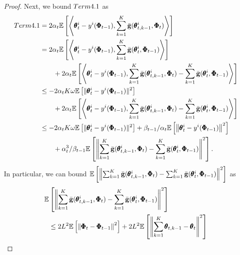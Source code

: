 \documentclass{article} %
\theoremstyle{plain}
\theoremstyle{definition}
\theoremstyle{remark}
\begin{document}
{\begin{proof}
Next, we bound $\textnormal{Term {4.1}}$ as
\begin{align}\label{eq:38}
    \textnormal{Term {4.1}}&=2\alpha_t\mathbb{E}\left[\left\langle\pmb{\theta}_{t}^i-y^i(\pmb{\Phi}_{t-1}), \sum_{k=1}^K\bar{\bg}(\pmb{\theta}_{t,k-1}^i,\pmb{\Phi}_t)\right\rangle\right]\nonumber\allowdisplaybreaks\\
    &=2\alpha_t\mathbb{E}\left[\left\langle\pmb{\theta}_{t}^i-y^i(\pmb{\Phi}_{t-1}), \sum_{k=1}^K\bar{\bg}(\pmb{\theta}_{t}^i,\pmb{\Phi}_{t-1})\right\rangle\right]\nonumber\allowdisplaybreaks\\
    &\qquad+2\alpha_t\mathbb{E}\left[\left\langle\pmb{\theta}_{t}^i-y^i(\pmb{\Phi}_{t-1}), \sum_{k=1}^K\bar{\bg}(\pmb{\theta}_{t,k-1}^i,\pmb{\Phi}_t)-\sum_{k=1}^K\bar{\bg}(\pmb{\theta}_{t}^i,\pmb{\Phi}_{t-1})\right\rangle\right]\nonumber\allowdisplaybreaks\\
    &\leq -2\alpha_tK\omega\mathbb{E}\left[\|\pmb{\theta}_t^i-y^i(\pmb{\Phi}_{t-1})\|^2\right]\nonumber\allowdisplaybreaks\\
    &\qquad+2\alpha_t\mathbb{E}\left[\left\langle\pmb{\theta}_{t}^i-y^i(\pmb{\Phi}_{t-1}), \sum_{k=1}^K\bar{\bg}(\pmb{\theta}_{t,k-1}^i,\pmb{\Phi}_t)-\sum_{k=1}^K\bar{\bg}(\pmb{\theta}_{t}^i,\pmb{\Phi}_{t-1})\right\rangle\right]\nonumber\allowdisplaybreaks\\
    &\leq -2\alpha_tK\omega\mathbb{E}\left[\|\pmb{\theta}_t^i-y^i(\pmb{\Phi}_{t-1})\|^2\right]+\beta_{t-1}/\alpha_t\mathbb{E}\left[\left\|\pmb{\theta}_{t}^i-y^i(\pmb{\Phi}_{t-1})\right\|^2 \right]\nonumber\allowdisplaybreaks\\
    &\qquad+\alpha_t^3/\beta_{t-1}\mathbb{E}\left[\left\|\sum_{k=1}^K\bar{\bg}(\pmb{\theta}_{t,k-1}^i,\pmb{\Phi}_t)-\sum_{k=1}^K\bar{\bg}(\pmb{\theta}_{t}^i,\pmb{\Phi}_{t-1})\right\|^2\right].
\end{align}
In particular, we can bound  $\mathbb{E}\left[\left\|\sum_{k=1}^K\bar{{\mathbf{g}}}(\pmb{\theta}_{t,k-1}^i,\pmb{\Phi}_t)-\sum_{k=1}^K\bar{{\mathbf{g}}}(\pmb{\theta}_{t}^i,\pmb{\Phi}_{t-1}) \right\|^2\right]$ as 
\begin{align}\label{eq:39}
\mathbb{E}&\left[\left\|\sum_{k=1}^K\bar{\bg}(\pmb{\theta}_{t,k-1}^i,\pmb{\Phi}_t)-\sum_{k=1}^K\bar{\bg}(\pmb{\theta}_{t}^i,\pmb{\Phi}_{t-1}) \right\|^2\right]\nonumber\allowdisplaybreaks\\
&\leq 2L^2\mathbb{E}\left[\left\|\pmb{\Phi}_t-\pmb{\Phi}_{t-1}\right\|^2\right]+2L^2\mathbb{E}\left[\left\|\sum_{k=1}^K\pmb{\theta}_{t,k-1}-\pmb{\theta}_t\right\|^2\right]\nonumber\allowdisplaybreaks\\

\end{align}
\end{proof}}
\end{document}
